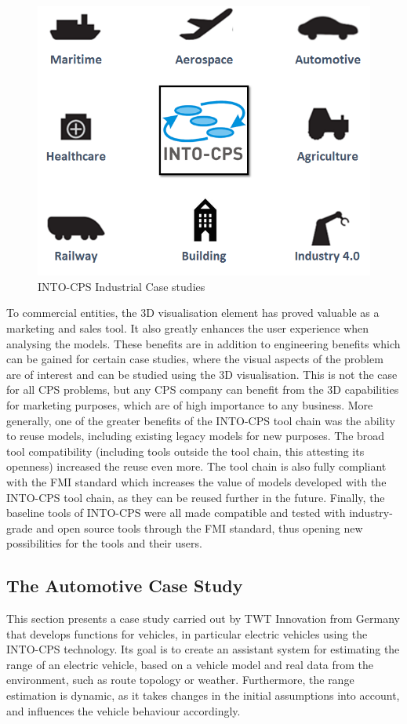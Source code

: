 \begin{figure}[!ht]
	\centering
		\includegraphics[width=0.5 \textwidth]{./figures/industrial}
	\caption{INTO-CPS Industrial Case studies}
	\label{fig:industrial}
\end{figure}

To commercial entities, the 3D visualisation element has proved valuable as a marketing and sales tool. It also greatly enhances the user experience when analysing the models. These benefits are in addition to engineering benefits which can be gained for certain case studies, where the visual aspects of the problem are of interest and can be studied using the 3D visualisation. This is not the case for all CPS problems, but any CPS company can benefit from the 3D capabilities for marketing purposes, which are of high importance to any business. More generally, one of the greater benefits of the INTO-CPS tool chain was the ability to reuse models, including existing legacy models for new purposes. The broad tool compatibility (including tools outside the tool chain, this attesting its openness) increased the reuse even more. The tool chain is also fully compliant with the FMI standard which increases the value of models developed with the INTO-CPS tool chain, as they can be reused further in the future. Finally, the baseline tools of INTO-CPS were all made compatible and tested with industry-grade and open source tools through the FMI standard, thus opening new possibilities for the tools and their users.

\subsection{The Automotive Case Study}

This section presents a case study carried out by TWT Innovation from Germany that develops functions for vehicles, in particular electric vehicles using the INTO-CPS technology. Its  goal is to create an assistant system for estimating the range of an electric vehicle, based on a vehicle model and real data from the environment, such as route topology or weather. Furthermore, the range estimation is dynamic, as it takes changes in the initial assumptions into account, and influences the vehicle behaviour accordingly.

